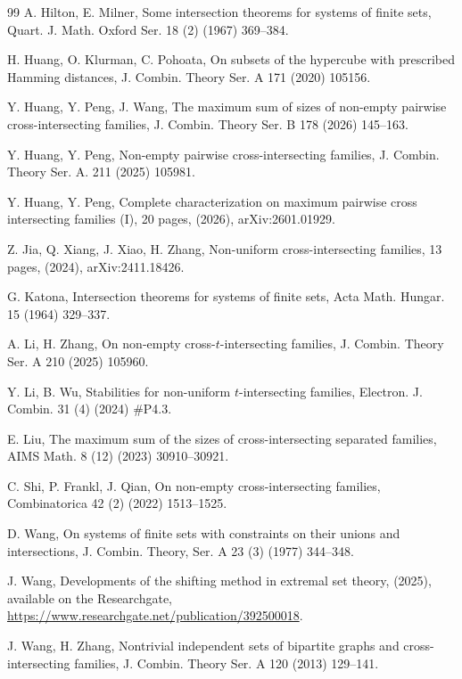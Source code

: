 \documentclass[11pt,a4paper]{article}
\begin{document}
\begin{thebibliography}{99}
A. Hilton, E. Milner, 
Some intersection theorems for systems of finite sets, 
Quart. J. Math. Oxford Ser. 18 (2) (1967) 369--384.

H. Huang, O. Klurman, C. Pohoata, 
On subsets of the hypercube with prescribed Hamming distances, 
J. Combin. Theory  Ser. A 171 (2020) 105156. 

Y. Huang, Y. Peng, J. Wang, 
The maximum sum of sizes of non-empty pairwise cross-intersecting families, { J. Combin. Theory Ser. B 178 (2026) 145--163.} 

Y. Huang, Y. Peng, 
Non-empty pairwise cross-intersecting families, 
J. Combin. Theory Ser. A. 211 (2025) 105981. 

Y. Huang, Y. Peng, 
Complete characterization on maximum pairwise cross intersecting families (I), 20 pages, 
(2026), arXiv:2601.01929.  

Z. Jia, Q. Xiang, J. Xiao,  H. Zhang, Non-uniform cross-intersecting families, 13 pages, (2024), arXiv:2411.18426.

 
G. Katona, Intersection theorems for systems of finite sets, Acta Math. Hungar. 15 (1964) 329--337.


A. Li, H. Zhang, On non-empty cross-$t$-intersecting families, J. Combin. Theory Ser. A 210 (2025) 105960.

Y. Li, B. Wu, Stabilities for non-uniform $t$-intersecting families, 
Electron. J. Combin. 31 (4) (2024) \#P4.3.


E. Liu, 
The maximum sum of the sizes of cross-intersecting separated families, 
AIMS Math. 8 (12) (2023) 30910--30921.


C. Shi, P. Frankl, J. Qian, 
On non-empty cross-intersecting families, 
Combinatorica 42 (2) (2022) 1513--1525.

D. Wang, On systems of finite sets with constraints on their unions and intersections, 
J. Combin. Theory, Ser. A 23 (3) (1977) 344--348. 

J. Wang, 
Developments of the shifting method in extremal set theory, (2025), available on the Researchgate,
\url{https://www.researchgate.net/publication/392500018}.


J. Wang, H. Zhang, 
Nontrivial independent sets of bipartite graphs and cross-intersecting families, 
J. Combin. Theory Ser. A 120 (2013) 129--141.



\end{thebibliography}
\end{document}
